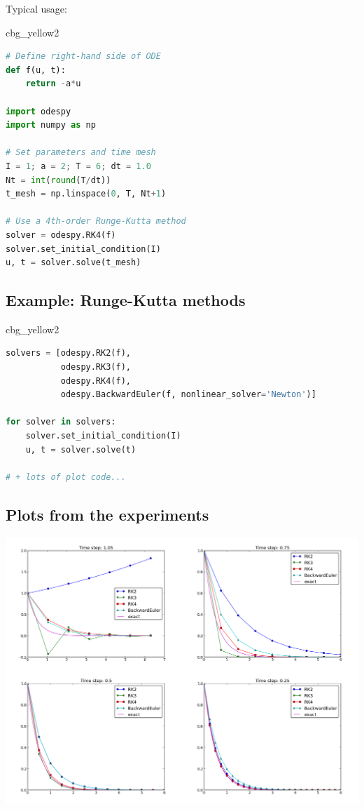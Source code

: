 \documentclass[%
oneside,                 %
final,                   %
10pt]{article}
\newenvironment{_cod_tight}[1]{
   \def\FrameCommand{\colorbox{#1}}
   \FrameRule0.6pt\MakeFramed {\FrameRestore}\vskip3mm}
   {\vskip0mm\endMakeFramed}
\newenvironment{cod}[1]{
\bgroup\rmfamily
\fboxsep=0mm\relax
\begin{_cod_tight}{#1}
\list{}{\parsep=-2mm\parskip=0mm\topsep=0pt\leftmargin=2mm
\rightmargin=2\leftmargin\leftmargin=4pt\relax}
\item\relax}
{\endlist\end{_cod_tight}\egroup}
\begin{document}
Typical usage:

\begin{cod}{cbg_yellow2}\begin{lstlisting}[language=Python,style=simple,xleftmargin=2mm]
# Define right-hand side of ODE
def f(u, t):
    return -a*u

import odespy
import numpy as np

# Set parameters and time mesh
I = 1; a = 2; T = 6; dt = 1.0
Nt = int(round(T/dt))
t_mesh = np.linspace(0, T, Nt+1)

# Use a 4th-order Runge-Kutta method
solver = odespy.RK4(f)
solver.set_initial_condition(I)
u, t = solver.solve(t_mesh)
\end{lstlisting}\end{cod}
\noindent

\subsection*{Example: Runge-Kutta methods}


\begin{cod}{cbg_yellow2}\begin{lstlisting}[language=Python,style=simple,xleftmargin=2mm]
solvers = [odespy.RK2(f),
           odespy.RK3(f),
           odespy.RK4(f),
           odespy.BackwardEuler(f, nonlinear_solver='Newton')]

for solver in solvers:
    solver.set_initial_condition(I)
    u, t = solver.solve(t)

# + lots of plot code...
\end{lstlisting}\end{cod}
\noindent

\subsection*{Plots from the experiments}



\centerline{\includegraphics[width=0.9\linewidth]{fig-genz/decay_odespy1_png.png}}
\end{document}
